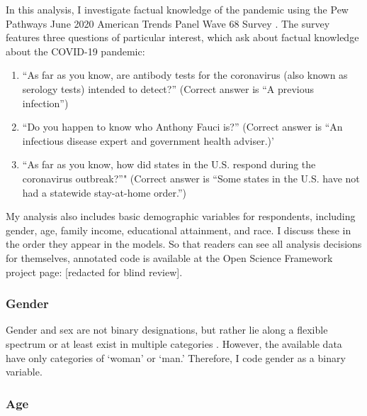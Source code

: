 \documentclass[11pt]{article}
\begin{document}
In this analysis, I investigate factual knowledge of the pandemic using the Pew Pathways June 2020 American Trends Panel Wave 68 Survey \citep{PewJune2020}. The survey features three questions of particular interest, which ask about factual knowledge about the COVID-19 pandemic:

\begin{enumerate}
\def\labelenumi{(\arabic{enumi})}
  \item ``As far as you know, are antibody tests for the coronavirus (also known as serology tests) intended to detect?'' (Correct answer is ``A previous infection'')
  \item ``Do you happen to know who Anthony Fauci is?'' (Correct answer is ``An infectious disease expert and government health adviser.)'
  \item ``As far as you know, how did states in the U.S. respond during the coronavirus outbreak?''" (Correct answer is ``Some states in the U.S. have not had a statewide stay-at-home order.'')
\end{enumerate}

My analysis also includes basic demographic variables for respondents, including gender, age, family income, educational attainment, and race. I discuss these in the order they appear in the models. So that readers can see all analysis decisions for themselves, annotated code is available at the Open Science Framework project page: [redacted for blind review].



\subsubsection{Gender}\label{sec:gender-vars}

Gender and sex are not binary designations, but rather lie along a flexible
spectrum or at least exist in multiple categories \citep{Connell2002b,
Fausto-Sterling1993, Fausto-Sterling2000, West1987, Maglioizzi2016}.
However, the available data have only categories of `woman' or
`man.' Therefore, I code gender as a binary variable.

\subsubsection{Age}\label{sec:age-vars}
\end{document}

